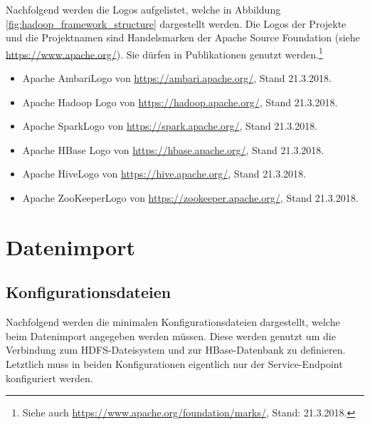 \noindent
Nachfolgend werden die Logos aufgelistet, welche in Abbildung \ref{fig:hadoop_framework_structure} dargestellt werden. Die Logos der Projekte und die Projektnamen sind Handelsmarken der Apache Source Foundation (siehe \url{https://www.apache.org/}). Sie dürfen in Publikationen genutzt werden.\footnote{Siehe auch \url{https://www.apache.org/foundation/marks/}, Stand: 21.3.2018.}

\begin{itemize}
\item Apache Ambari\texttrademark\thinspace Logo von \url{https://ambari.apache.org/}, Stand 21.3.2018. 
\item Apache Hadoop\textsuperscript{\textregistered} Logo von \url{https://hadoop.apache.org/}, Stand 21.3.2018.
\item Apache Spark\texttrademark\thinspace Logo von \url{https://spark.apache.org/}, Stand 21.3.2018.
\item Apache HBase\textsuperscript{\textregistered} Logo von \url{https://hbase.apache.org/}, Stand 21.3.2018.
\item Apache Hive\texttrademark\thinspace Logo von \url{https://hive.apache.org/}, Stand 21.3.2018.
\item Apache ZooKeeper\texttrademark\thinspace Logo von \url{https://zookeeper.apache.org/}, Stand 21.3.2018.
\end{itemize}


\chapter{Datenimport}
\section{Konfigurationsdateien}
\label{sec:appendix_data_import_config_management}
Nachfolgend werden die minimalen Konfigurationsdateien dargestellt, welche beim Datenimport angegeben werden müssen. Diese werden genutzt um die Verbindung zum HDFS-Dateisystem und zur HBase-Datenbank zu definieren. Letztlich muss in beiden Konfigurationen eigentlich nur der Service-Endpoint konfiguriert werden.





%